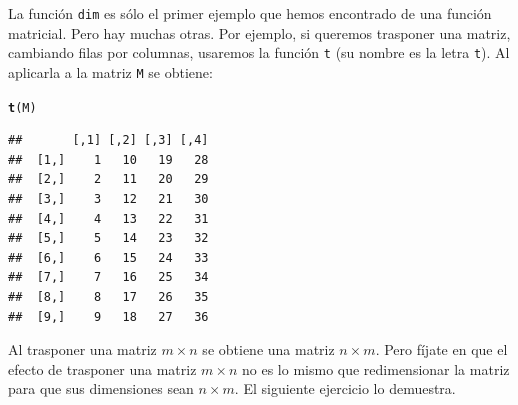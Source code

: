 \documentclass[10pt,a4paper]{article}\usepackage[]{graphicx}\usepackage[]{color}
\makeatletter
\newcommand{\hlstd}[1]{\textcolor[rgb]{0.345,0.345,0.345}{#1}}%
\newcommand{\hlkwd}[1]{\textcolor[rgb]{0.737,0.353,0.396}{\textbf{#1}}}%
\newenvironment{kframe}{%
 \def\at@end@of@kframe{}%
 \ifinner\ifhmode%
  \def\at@end@of@kframe{\end{minipage}}%
  \begin{minipage}{\columnwidth}%
 \fi\fi%
 \def\FrameCommand##1{\hskip\@totalleftmargin \hskip-\fboxsep
 \colorbox{shadecolor}{##1}\hskip-\fboxsep
     \hskip-\linewidth \hskip-\@totalleftmargin \hskip\columnwidth}%
 \MakeFramed {\advance\hsize-\width
   \@totalleftmargin\z@ \linewidth\hsize
   \@setminipage}}%
 {\par\unskip\endMakeFramed%
 \at@end@of@kframe}
\newenvironment{knitrout}{}{} %
\newcounter {cont01}
\makeatother
\begin{document}
La función {\tt dim} es sólo el primer ejemplo que hemos encontrado de una función matricial. Pero hay muchas otras. Por ejemplo, si queremos trasponer una matriz, cambiando filas por columnas, usaremos la función {\tt t} (su nombre es la letra {\tt t}). Al aplicarla a la matriz {\tt M} se obtiene:
\begin{knitrout}
\color{fgcolor}\begin{kframe}
\begin{alltt}
    \hlkwd{t}\hlstd{(M)}
\end{alltt}
\begin{verbatim}
##       [,1] [,2] [,3] [,4]
##  [1,]    1   10   19   28
##  [2,]    2   11   20   29
##  [3,]    3   12   21   30
##  [4,]    4   13   22   31
##  [5,]    5   14   23   32
##  [6,]    6   15   24   33
##  [7,]    7   16   25   34
##  [8,]    8   17   26   35
##  [9,]    9   18   27   36
\end{verbatim}
\end{kframe}
\end{knitrout}
Al trasponer una matriz $m\times n$ se obtiene una matriz $n\times m$. Pero fíjate en que el efecto de trasponer una matriz $m\times n$ no es lo mismo que redimensionar la matriz para que sus dimensiones sean $n\times m$. El siguiente ejercicio lo demuestra.
\end{document}
